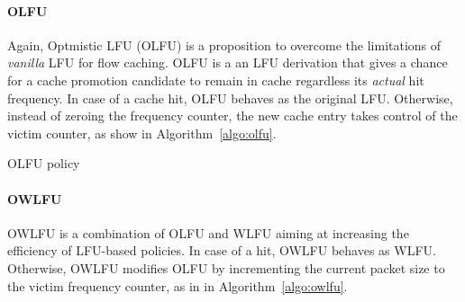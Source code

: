 \paragraph{OLFU}
Again, Optmistic LFU (OLFU) is a proposition to overcome the limitations of \textit{vanilla} LFU for flow caching.
OLFU is a an LFU derivation that gives a chance for a cache promotion candidate to remain in cache regardless its \textit{actual} hit frequency.
In case of a cache hit, OLFU behaves as the original LFU.
Otherwise, instead of zeroing the frequency counter, the new cache entry takes control of the victim counter, as show in Algorithm~\ref{algo:olfu}.

\begin{algorithm}[]
\caption{OLFU policy}
\label{algo:olfu}
\SetInd{0.1em}{.9em}
\SetAlgoLined
\footnotesize
{}
%
%
%
%
%
\end{algorithm}


\paragraph{OWLFU}
OWLFU is a combination of OLFU and WLFU aiming at increasing the efficiency of LFU-based policies.
In case of a hit, OWLFU behaves as WLFU.
Otherwise, OWLFU modifies OLFU by incrementing the current packet size to the victim frequency counter, as in in Algorithm~\ref{algo:owlfu}.

